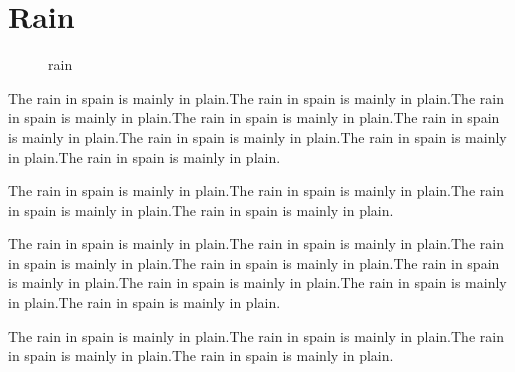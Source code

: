 \documentclass[a5paper,book]{jlreq}
\begin{document}
\chapter{Rain}

\begin{figure}[b]
  \caption{rain}
\end{figure}

The rain in spain is mainly in plain.The rain in spain is mainly in plain.The rain in spain is mainly in plain.The rain in spain is mainly in plain.The rain in spain is mainly in plain.The rain in spain is mainly in plain.The rain in spain is mainly in plain.The rain in spain is mainly in plain.

The rain in spain is mainly in plain.The rain in spain is mainly in plain.The rain in spain is mainly in plain.The rain in spain is mainly in plain.

The rain in spain is mainly in plain.The rain in spain is mainly in plain.The rain in spain is mainly in plain.The rain in spain is mainly in plain.The rain in spain is mainly in plain.The rain in spain is mainly in plain.The rain in spain is mainly in plain.The rain in spain is mainly in plain.

The rain in spain is mainly in plain.The rain in spain is mainly in plain.The rain in spain is mainly in plain.The rain in spain is mainly in plain.



\end{document}
